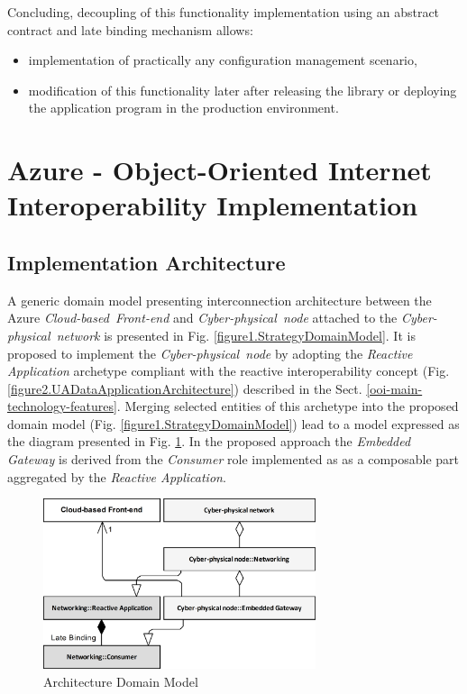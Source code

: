 \documentclass{jacsart}
\begin{document}
Concluding, decoupling of this functionality implementation using an abstract contract and late binding mechanism allows:

\begin{itemize}
      \item implementation of practically any configuration management scenario,
      \item modification of this functionality later after releasing the library or deploying the application program in the production environment.
\end{itemize}

\section{Azure - Object-Oriented Internet Interoperability Implementation}\label{sect.gateway-implementation}

\subsection{Implementation Architecture}\label{subsection.GatewayImplementationArchitecture}

A generic domain model presenting interconnection architecture between the Azure \textit{Cloud-based\ Front-end} and \textit{Cyber-physical\ node} attached to the \textit{Cyber-physical\ network} is presented in Fig. \ref*{figure1.StrategyDomainModel}. It is proposed to implement the \textit{Cyber-physical\ node} by adopting the \textit{Reactive Application} archetype compliant with the reactive interoperability concept (Fig. \ref*{figure2.UADataApplicationArchitecture}) described in the Sect. \ref*{ooi-main-technology-features}. Merging selected entities of this archetype into the proposed domain model (Fig. \ref*{figure1.StrategyDomainModel}) lead to a model expressed as the diagram presented in Fig. \ref*{figure3.ImplementationDomainModel}. In the proposed approach the \textit{Embedded Gateway} is derived from the \textit{Consumer} role implemented as as a composable part aggregated by the \textit{Reactive Application}.

\begin{figure}
      \centering
      \includegraphics[width=8cm]{../.Media/ImplementationDomainModel.png}
      \caption{Architecture Domain Model}\label{figure3.ImplementationDomainModel}
\end{figure}
\end{document}
